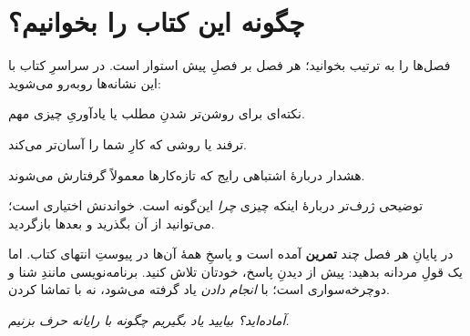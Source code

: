 \section*{چگونه این کتاب را بخوانیم؟}

فصل‌ها را به ترتیب بخوانید؛ هر فصل بر فصلِ پیش استوار است. در سراسرِ کتاب
با این نشانه‌ها روبه‌رو می‌شوید:

\begin{note}
نکته‌ای برای روشن‌تر شدنِ مطلب یا یادآوریِ چیزی مهم.
\end{note}

\begin{tip}
ترفند یا روشی که کارِ شما را آسان‌تر می‌کند.
\end{tip}

\begin{warn}
هشدار دربارهٔ اشتباهی رایج که تازه‌کارها معمولاً گرفتارش می‌شوند.
\end{warn}

\begin{deep}
توضیحی ژرف‌تر دربارهٔ اینکه چیزی \emph{چرا} این‌گونه است. خواندنش اختیاری
است؛ می‌توانید از آن بگذرید و بعدها بازگردید.
\end{deep}

در پایانِ هر فصل چند \textbf{تمرین} آمده است و پاسخِ همهٔ آن‌ها در پیوستِ
انتهای کتاب. اما یک قولِ مردانه بدهید: پیش از دیدنِ پاسخ، خودتان تلاش کنید.
برنامه‌نویسی مانندِ شنا و دوچرخه‌سواری است؛ با \emph{انجام دادن} یاد گرفته
می‌شود، نه با تماشا کردن.

\vspace{0.5cm}
\begin{center}
\emph{آماده‌اید؟ بیایید یاد بگیریم چگونه با رایانه حرف بزنیم.}
\end{center}
\clearpage
